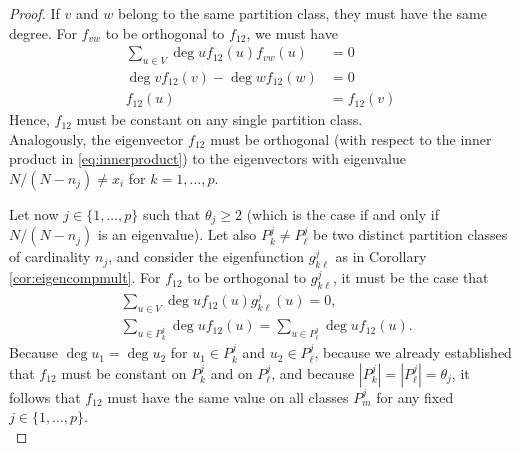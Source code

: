 \documentclass{article}
\theoremstyle{plain}
\theoremstyle{definition}
\theoremstyle{remark}
\begin{document}
\begin{proof}
    If $v$ and $w$ belong to the same partition class, they must have the same degree. For $f_{vw}$ to be orthogonal to $f_{12}$, we must have
    \begin{align*}
        \sum_{u \in V}\deg u f_{12}(u)f_{vw}(u)&= 0 \\
        \deg v f_{12}(v) - \deg w f_{12}(w) &= 0 \\
        f_{12}(u) &= f_{12}(v)
    \end{align*}
    Hence, $f_{12}$ must be constant on any single partition class.\\

    Analogously, the eigenvector $f_{12}$ must be orthogonal (with respect to the inner product in \eqref{eq:innerproduct}) to the eigenvectors with eigenvalue $N/(N-n_j)\neq x_i$ for $k=1,\ldots,p$.

    Let now $j\in \{1,\ldots,p\}$ such that $\theta_j\geq 2$ (which is the case if and only if $N/(N-n_j)$ is an eigenvalue). Let also $P_k^j \neq P_{\ell}^j$ be two distinct partition classes of cardinality $n_j$, and consider the eigenfunction $g_{k \ell}^j$ as in Corollary \ref{cor:eigencompmult}. For $f_{12}$ to be orthogonal to $g_{k \ell}^j$, it must be the case that
    \begin{align*}
        &\sum_{u\in V}\deg u f_{12}(u)g_{k \ell}^j(u) = 0, \\
        &\sum_{u\in P_k^j} \deg u f_{12}(u) = \sum_{u\in P_\ell^j} \deg u f_{12}(u).
    \end{align*}
    Because $\deg u_1 = \deg u_2$ for $u_1\in P_k^j$ and $u_2\in P_\ell^j$, because we already established that $f_{12}$ must be constant on $P_k^j$ and on $P_\ell^j$, and because $|P_k^j| = |P_\ell^j| = \theta_j$,
    it follows that $f_{12}$ must have the same value on all classes $P_m^j$ for any fixed $j\in \{1,\ldots,p\}$.\\


\end{proof}
\end{document}
